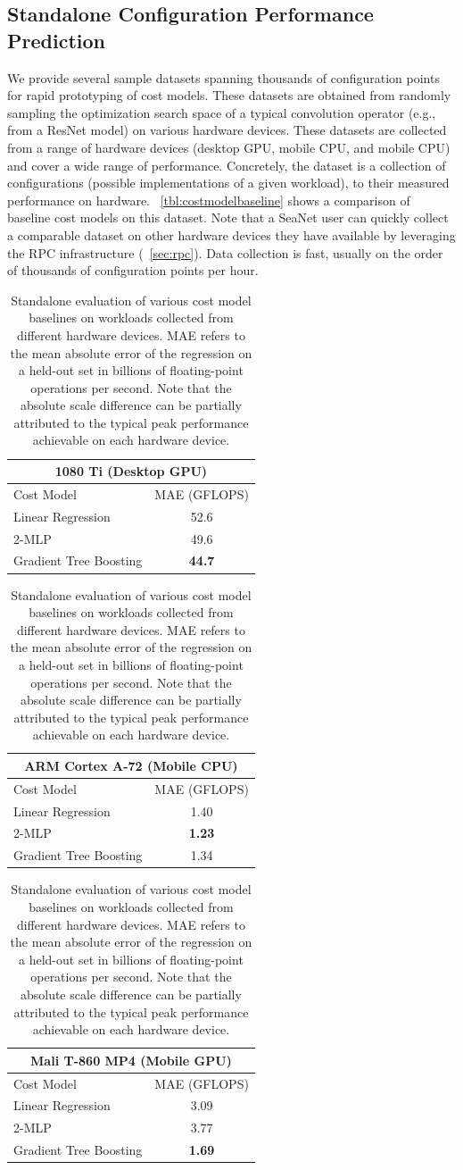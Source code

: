 \subsection{Standalone Configuration Performance Prediction}
We provide several sample datasets spanning thousands of configuration points for rapid prototyping of cost models.
These datasets are obtained from randomly sampling the optimization search space of a typical convolution operator (e.g., from a ResNet model) on various hardware devices.
These datasets are collected from a range of hardware devices (desktop GPU, mobile CPU, and mobile CPU) and cover a wide range of performance.
Concretely, the dataset is a collection of configurations (possible implementations of a given workload), to their measured performance on hardware.
~\autoref{tbl:costmodelbaseline} shows a comparison of baseline cost models on this dataset.
Note that a SeaNet user can quickly collect a comparable dataset on other hardware devices they have available by leveraging the RPC infrastructure (~\autoref{sec:rpc}).
Data collection is fast, usually on the order of thousands of configuration points per hour.
\begin{table}[]
    \centering
    \begin{tabular}{l|c}
    \hline
    \multicolumn{2}{c}{1080 Ti (Desktop GPU)} \\
    \hline
    Cost Model&MAE (GFLOPS)\\
    \hline
    Linear Regression & 52.6 \\
    2-MLP & 49.6  \\
    Gradient Tree Boosting &  \textbf{44.7}\\
    \end{tabular}
        \begin{tabular}{l|c}
    \hline
    \multicolumn{2}{c}{ARM Cortex A-72 (Mobile CPU)} \\
    \hline
    Cost Model&MAE (GFLOPS)\\
    \hline
    Linear Regression & 1.40 \\
    2-MLP & \textbf{1.23} \\
    Gradient Tree Boosting & 1.34\\
    \end{tabular}
    \begin{tabular}{l|c}
    \hline
    \multicolumn{2}{c}{Mali T-860 MP4 (Mobile GPU)} \\
    \hline
    Cost Model&MAE (GFLOPS)\\
    \hline
    Linear Regression & 3.09 \\
    2-MLP & 3.77 \\
    Gradient Tree Boosting & \textbf{1.69}\\
    \end{tabular}
    \caption{Standalone evaluation of various cost model baselines on workloads collected from different hardware devices.
    MAE refers to the mean absolute error of the regression on a held-out set in billions of floating-point operations per second. Note that the absolute scale difference can be partially attributed to the typical peak performance achievable on each hardware device.}
    \label{tbl:costmodelbaseline}
\end{table}


